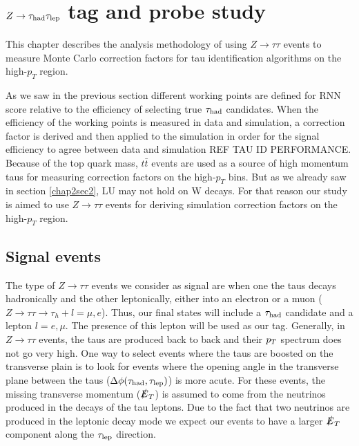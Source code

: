 \chapter{$Z\to\tau_\text{had}\tau_\text{lep}$ tag and probe study}\label{chap1}
This chapter describes the analysis methodology of using $Z\to\tau\tau$ events to measure Monte Carlo correction factors for tau identification algorithms on the high-$p_T$ region.

As we saw in the previous section different working points are defined for RNN score relative to the efficiency of selecting true $\tau_\text{had}$ candidates. When the efficiency of the working points is measured in data and simulation, a correction factor is derived and then applied to the simulation in order for the signal efficiency to agree between data and simulation REF TAU ID PERFORMANCE. Because of the top quark mass, $t\bar{t}$ events are used as a source of high momentum taus for measuring correction factors on the high-$p_T$ bins. But as we already saw in section \ref{chap2sec2}, LU may not hold on W decays. For that reason our study is aimed to use $Z\to\tau\tau$ events for deriving simulation correction factors on the high-$p_T$ region.   

\section{Signal events}\label{chap4sec1}
The type of $Z\to\tau\tau$ events we consider as signal are when one the taus decays hadronically and the other leptonically, either into an electron or a muon ($Z\to\tau\tau\to\tau_h +l=\mu,e$). Thus, our final states will include a $\tau_\text{had}$ candidate and a lepton $l=e,\mu$. The presence of this lepton will be used as our tag. 
Generally, in $Z\to\tau\tau$ events, the taus are produced back to back and their $p_T$ spectrum does not go very high. One way to select events where the taus are boosted on the transverse plain is to look for events where the opening angle in the transverse plane between the taus ($\Delta\phi(\tau_\text{had},\tau_\text{lep})$) is more acute. For these events, the missing transverse momentum ($\slashed{E}_T$) is assumed to come from the neutrinos produced in the decays of the tau leptons. Due to the fact that two neutrinos are produced in the leptonic decay mode we expect our events to have a larger $\slashed{E}_T$ component along the $\tau_\text{lep}$ direction.

